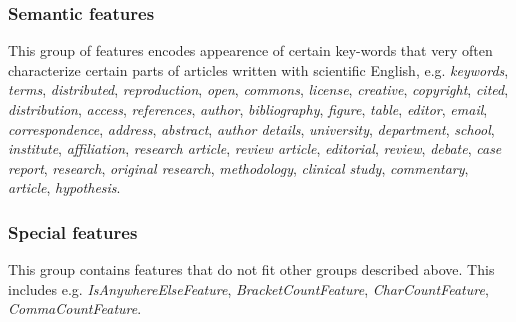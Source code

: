 \subsubsection{Semantic features}
This group of features encodes appearence of certain key-words that very often characterize certain parts of articles written with scientific English, e.g. \textit{keywords}, \textit{terms}, \textit{distributed}, \textit{reproduction}, \textit{open}, \textit{commons}, \textit{license}, \textit{creative}, \textit{copyright}, \textit{cited}, \textit{distribution}, \textit{access}, \textit{references}, \textit{author}, \textit{bibliography}, \textit{figure}, \textit{table}, \textit{editor}, \textit{email}, \textit{correspondence}, \textit{address}, \textit{abstract}, \textit{author details}, \textit{university}, \textit{department}, \textit{school}, \textit{institute}, \textit{affiliation}, \textit{research article}, \textit{review article}, \textit{editorial}, \textit{review}, \textit{debate}, \textit{case report}, \textit{research}, \textit{original research}, \textit{methodology}, \textit{clinical study}, \textit{commentary}, \textit{article}, 
 \textit{hypothesis}.

\subsubsection{Special features}
This group contains features that do not fit other groups described above. This includes e.g. \textit{IsAnywhereElseFeature}, \textit{BracketCountFeature}, \textit{CharCountFeature}, \textit{CommaCountFeature}.